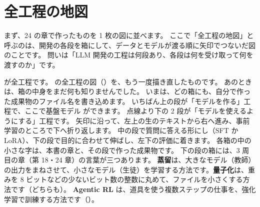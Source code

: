 \section{全工程の地図}\label{sec:cap-map}

まず、24 の章で作ったものを 1 枚の図に並べます。
ここで「全工程の地図」と呼ぶのは、開発の各段を箱にして、データとモデルが渡る順に矢印でつないだ図のことです。
問いは「LLM 開発の工程は何段あり、各段は何を受け取って何を渡すのか」です。

が全工程です。
の全工程の図（）を、もう一度描き直したものです。
あのときは、箱の中身をまだ何も知りませんでした。
いまは、どの箱にも、自分で作った成果物のファイル名を書き込めます。
いちばん上の段が「モデルを作る」工程で、ここで基盤モデル  ができます。
点線より下の 2 段が「モデルを使えるようにする」工程です。
矢印に沿って、左上の生のテキストから右へ進み、事前学習のところで下へ折り返します。
中の段で質問に答える形にし（SFT か LoRA）、下の段で目的に合わせて伸ばし、左下の評価に着きます。
各箱の中の小さな字は、本書の章と、その段で作った成果物です。
下の段の箱には、3 周目の章（第 18・24 章）の言葉が三つあります。
\textbf{蒸留}は、大きなモデル（教師）の出力をまねさせて、小さなモデル（生徒）を学習する方法です。\textbf{量子化}は、重みを 8 ビットなどの少ないビット数の整数に丸めて、ファイルを小さくする方法です（どちらも）。
\textbf{Agentic RL} は、道具を使う複数ステップの仕事を、強化学習で訓練する方法です（）。

